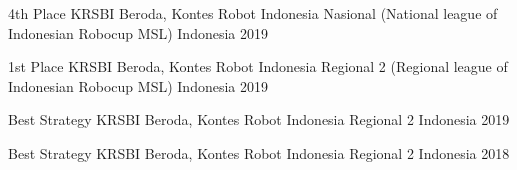\begin{cvhonors}

  \cvhonor
    {4th Place} %
    {KRSBI Beroda, Kontes Robot Indonesia Nasional (National league of Indonesian Robocup MSL)} %
    {Indonesia} %
    {2019} %

  \cvhonor
    {1st Place} %
    {KRSBI Beroda, Kontes Robot Indonesia Regional 2 (Regional league of Indonesian Robocup MSL)} %
    {Indonesia} %
    {2019} %

  \cvhonor
    {Best Strategy} %
    {KRSBI Beroda, Kontes Robot Indonesia Regional 2} %
    {Indonesia} %
    {2019} %

  \cvhonor
    {Best Strategy} %
    {KRSBI Beroda, Kontes Robot Indonesia Regional 2} %
    {Indonesia} %
    {2018} %
\end{cvhonors}
